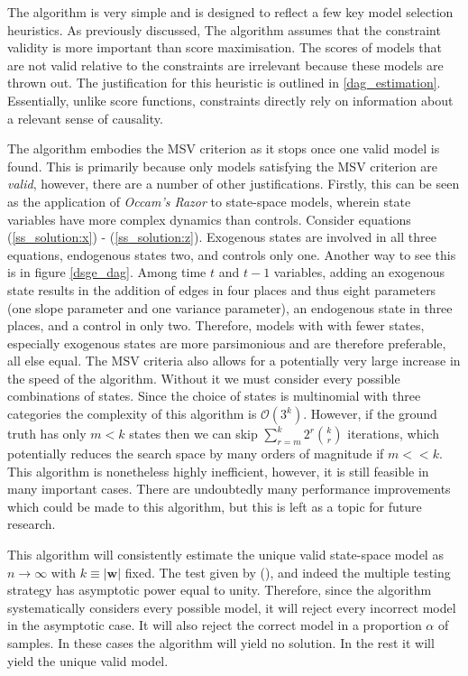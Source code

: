 \documentclass{article}
\begin{document}
The algorithm is very simple and is designed to reflect a few key model selection heuristics. As previously discussed, The algorithm assumes that the constraint validity is more important than score maximisation. The scores of models that are not valid relative to the constraints are irrelevant because these models are thrown out. The justification for this heuristic is outlined in \ref{dag_estimation}. Essentially, unlike score functions, constraints directly rely on information about a relevant sense of causality.

The algorithm embodies the MSV criterion as it stops once one valid model is found. This is primarily because only models satisfying the MSV criterion are \textit{valid}, however, there are a number of other justifications. Firstly, this can be seen as the application of \textit{Occam's Razor} to state-space models, wherein state variables have more complex dynamics than controls. Consider equations (\ref{ss_solution:x}) - (\ref{ss_solution:z}). Exogenous states are involved in all three equations, endogenous states two, and controls only one. Another way to see this is in figure \ref{dsge_dag}. Among time $t$ and $t-1$ variables, adding an exogenous state results in the addition of edges in four places and thus eight parameters (one slope parameter and one variance parameter), an endogenous state in three places, and a control in only two. Therefore, models with with fewer states, especially exogenous states are more parsimonious and are therefore preferable, all else equal. The MSV criteria also allows for a potentially very large increase in the speed of the algorithm. Without it we must consider every possible combinations of states. Since the choice of states is multinomial with three categories the complexity of this algorithm is $\mathcal{O}(3^k)$. However, if the ground truth has only $m < k$ states then we can skip $\sum_{r=m}^{k} 2^r {\binom{k}{r}}$ iterations, which potentially reduces the search space by many orders of magnitude if $m << k$. This algorithm is nonetheless highly inefficient, however, it is still feasible in many important cases. There are undoubtedly many performance improvements which could be made to this algorithm, but this is left as a topic for future research.

This algorithm will consistently estimate the unique valid state-space model as $n \rightarrow \infty$ with $k \equiv |\mathbf{w}|$ fixed. The test given by \citeauthor{srivastava2005some} (\citeyear{srivastava2005some}), and indeed the multiple testing strategy has asymptotic power equal to unity. Therefore, since the algorithm systematically considers every possible model, it will reject every incorrect model in the asymptotic case. It will also reject the correct model in a proportion $\alpha$ of samples. In these cases the algorithm will yield no solution. In the rest it will yield the unique valid model. 
\end{document}
